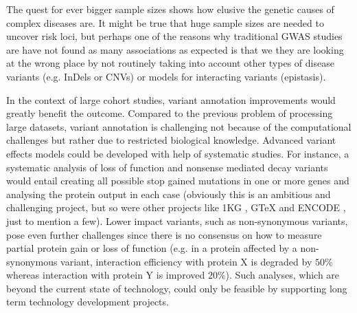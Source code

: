 The quest for ever bigger sample sizes shows how elusive the genetic causes of complex diseases are. 
It might be true that huge sample sizes are needed to uncover risk loci, but perhaps one of the reasons why traditional GWAS studies are have not found as many associations as expected is that we they are looking at the wrong place by not routinely taking into account other types of disease variants (e.g. InDels or CNVs) or models for interacting variants (epistasis).

In the context of large cohort studies, variant annotation improvements would greatly benefit the outcome.
Compared to the previous problem of processing large datasets, variant annotation is challenging not because of the computational challenges but rather due to restricted biological knowledge.
Advanced variant effects models could be developed with help of systematic studies.
For instance, a systematic analysis of loss of function and nonsense mediated decay variants would entail creating all possible stop gained mutations in one or more genes and analysing the protein output in each case (obviously this is an ambitious and challenging project, but so were other projects like 1KG \cite{10002012integrated}, GTeX \cite{lonsdale2013genotype} and ENCODE \cite{encode2012integrated}, just to mention a few).
Lower impact variants, such as non-synonymous variants, pose even further challenges since there is no consensus on how to measure partial protein gain or loss of function (e.g. in a protein affected by a non-synonymous variant, interaction efficiency with protein X is degraded by $50\%$ whereas interaction with protein Y is improved $20\%$).
Such analyses, which are beyond the current state of technology, could only be feasible by supporting long term technology development projects.

